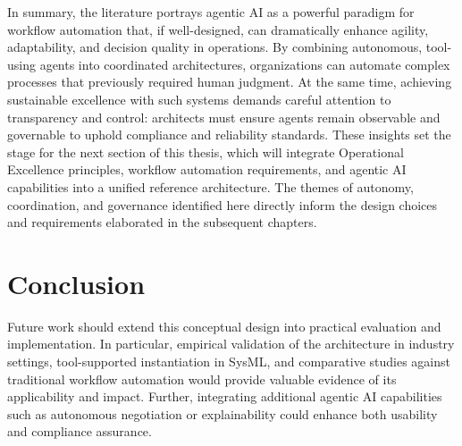 In summary, the literature portrays agentic AI as a powerful paradigm for workflow automation that, if well-designed, can dramatically enhance agility, adaptability, and decision quality in operations. By combining autonomous, tool-using agents into coordinated architectures, organizations can automate complex processes that previously required human judgment. At the same time, achieving sustainable excellence with such systems demands careful attention to transparency and control: architects must ensure agents remain observable and governable to uphold compliance and reliability standards. These insights set the stage for the next section of this thesis, which will integrate Operational Excellence principles, workflow automation requirements, and agentic AI capabilities into a unified reference architecture. The themes of autonomy, coordination, and governance identified here directly inform the design choices and requirements elaborated in the subsequent chapters. 

\section{Conclusion}
Future work should extend this conceptual design into practical evaluation and implementation. In particular, empirical validation of the architecture in industry settings, tool-supported instantiation in SysML, and comparative studies against traditional workflow automation would provide valuable evidence of its applicability and impact. Further, integrating additional agentic AI capabilities such as autonomous negotiation or explainability could enhance both usability and compliance assurance.  